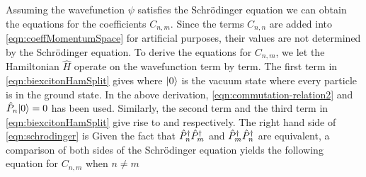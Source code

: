 Assuming the wavefunction $\psi$ satisfies the Schr{\" o}dinger equation
we can obtain the equations for the coefficients $C_{n, m}$. Since the terms $C_{n, n}$ are added into
 \autoref{eqn:coeffMomentumSpace} for artificial purposes, their values are not determined by the Schr{\" o}dinger
 equation. To derive the equations for $C_{n, m}$, we let the Hamiltonian $\hat{H}$ operate on the wavefunction
 term by term. The first term in \autoref{eqn:biexcitonHamSplit} gives 
where $| 0 \rangle$ is the vacuum state where every particle is in the ground state. 
In the above derivation, \autoref{eqn:commutation-relation2} and $\hat{P}_{n}| 0 \rangle = 0$ has been used. Similarly, the
 second term and the third term in \autoref{eqn:biexcitonHamSplit} give rise to 
and
respectively. The right hand side of \autoref{eqn:schrodinger} is 
Given the fact that $\hat{P}^{\dagger}_{n}\hat{P}^{\dagger}_{m}$ and $\hat{P}^{\dagger}_{m}\hat{P}^{\dagger}_{n}$ are equivalent, a comparison of both sides of the
 Schr{\"o}dinger equation yields the following equation for $C_{n, m}$ when $n \neq m$
